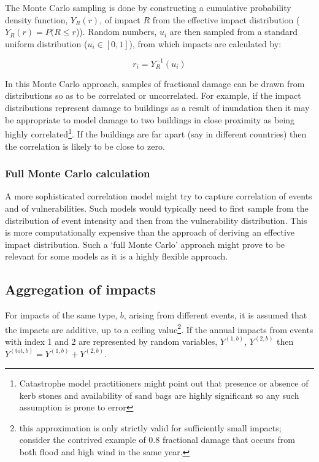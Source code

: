 \documentclass[a4paper,11pt]{extarticle} %
\begin{document}
The Monte Carlo sampling is done by constructing a cumulative probability density function, $Y_R(r)$, of impact $R$ from the effective impact distribution ($Y_R(r) = P(R \le r$)). Random numbers, $u_i$ are then sampled from a standard uniform distribution ($u_i \in [0, 1]$), from which impacts are calculated by:

\begin{equation}
	\label{Eq:sampling}
	r_i = Y^{-1}_R(u_i)
\end{equation}   

In this Monte Carlo approach, samples of fractional damage can be drawn from distributions so as to be correlated or uncorrelated. For example, if the impact distributions represent damage to buildings as a result of inundation then it may be appropriate to model damage to two buildings in close proximity as being highly correlated\footnote{Catastrophe model practitioners might point out that presence or absence of kerb stones and availability of sand bags are highly significant so any such assumption is prone to error}. If the buildings are far apart (say in different countries) then the correlation is likely to be close to zero.

\subsubsection{Full Monte Carlo calculation}
A more sophisticated correlation model might try to capture correlation of events and of vulnerabilities. Such models would typically need to first sample from the distribution of event intensity and then from the vulnerability distribution. This is more computationally expensive than the approach of deriving an effective impact distribution. Such a `full Monte Carlo' approach might prove to be relevant for some models as it is a highly flexible approach. 
   

\subsection{Aggregation of impacts}
For impacts of the same type, $b$, arising from different events, it is assumed that the impacts are additive, up to a ceiling value\footnote{this approximation is only strictly valid for sufficiently small impacts; consider the contrived example of 0.8 fractional damage that occurs from both flood and high wind in the same year.}. If the annual impacts from events with index 1 and 2 are represented by random variables, $Y^{(1,b)}$, $Y^{(2,b)}$ then $Y^{(\text{tot}, b)} = Y^{(1,b)} + Y^{(2,b)}$. 
\end{document}
